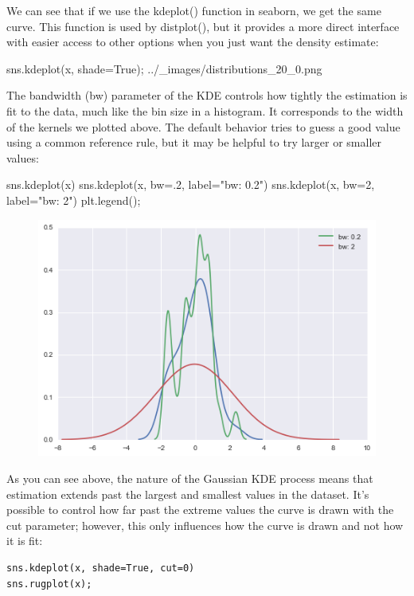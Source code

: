 \begin{frame}
We can see that if we use the kdeplot() function in seaborn, we get the same curve. This function is used by distplot(), but it provides a more direct interface with easier access to other options when you just want the density estimate:

sns.kdeplot(x, shade=True);
../_images/distributions_20_0.png
\end{frame}
\begin{frame}
The bandwidth (bw) parameter of the KDE controls how tightly the estimation is fit to the data, much like the bin size in a histogram. It corresponds to the width of the kernels we plotted above. The default behavior tries to guess a good value using a common reference rule, but it may be helpful to try larger or smaller values:

sns.kdeplot(x)
sns.kdeplot(x, bw=.2, label="bw: 0.2")
sns.kdeplot(x, bw=2, label="bw: 2")
plt.legend();
\begin{figure}
\centering
\includegraphics[width=0.7\linewidth]{images/distributions_22_0}
\caption{}
\label{fig:distributions_22_0}
\end{figure}

\end{frame}
\begin{frame}
	\large
As you can see above, the nature of the Gaussian KDE process means that estimation extends past the largest and smallest values in the dataset. It’s possible to control how far past the extreme values the curve is drawn with the cut parameter; however, this only influences how the curve is drawn and not how it is fit:

\begin{verbatim}
sns.kdeplot(x, shade=True, cut=0)
sns.rugplot(x);
\end{verbatim}
\end{frame}
